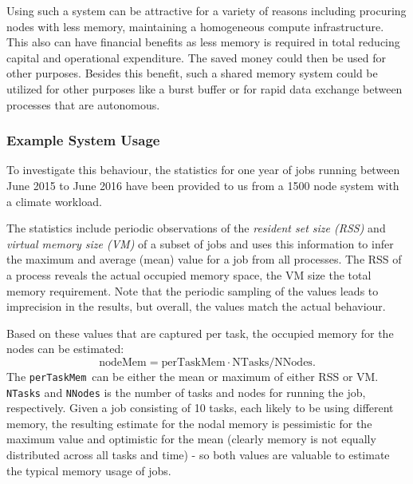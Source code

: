 \documentclass{../../template/esiwace-report}
\begin{document}
Using such a system can be attractive for a variety of reasons including procuring nodes with less memory, maintaining a homogeneous compute infrastructure. This also can have financial benefits as less memory is required in total
reducing capital and operational expenditure.
The saved money could then be used for other purposes.
Besides this benefit, such a shared memory system could be utilized for other purposes like a burst buffer or for rapid data exchange between processes that are autonomous.


\subsubsection{Example System Usage}

To investigate this behaviour, the statistics for one year of jobs running between June 2015 to June 2016 have been provided to us from a 1500 node system with a climate workload. 

The statistics include periodic observations of the \textit{resident set size (RSS)} and  \textit{virtual memory size (VM)} of a subset of jobs and uses this information to infer the maximum and average (mean) value for a job from all processes.
The RSS of a process reveals the actual occupied memory space, the VM size the total memory requirement. 
Note that the periodic sampling of the values leads to imprecision in the results, but overall, the values match the actual behaviour.

Based on these values that are captured per task, the occupied memory for the nodes can be estimated: \[
\mathrm{nodeMem} = \mathrm{perTaskMem} \cdot \mathrm{NTasks} / \mathrm{NNodes}.\]
The \texttt{perTaskMem}\ can be either the mean or maximum of either RSS or VM. \texttt{NTasks} and \texttt{NNodes} is the number of tasks and nodes for running the job, respectively.
Given a job consisting of 10 tasks, each likely to be using different memory, the resulting estimate for the nodal memory is pessimistic for the maximum value and optimistic for the mean (clearly memory is not equally distributed across all tasks and time) - so both values are valuable to estimate the typical memory usage of jobs.
\end{document}
